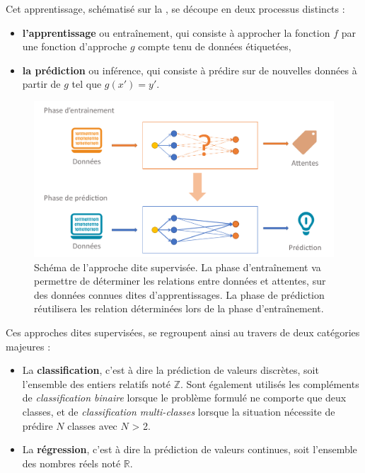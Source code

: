 Cet apprentissage, schématisé sur la , se découpe en deux processus distincts :
\begin{itemize}
    \item \textbf{l’apprentissage} ou entraînement, qui consiste à approcher la fonction $f$ par une fonction d’approche $g$ compte tenu de données étiquetées,
    \item \textbf{la prédiction} ou inférence, qui consiste à prédire sur de nouvelles données à partir de $g$ tel que $g(x') = y'$.
\end{itemize}\par

\begin{figure}[H]
    \centering
    \includegraphics[width=0.8\linewidth]{contents/chapter_3/resources/scheme_supervised_classification.pdf}
    \caption{Schéma de l’approche dite supervisée. La phase d'entraînement va permettre de déterminer les relations entre données et attentes, sur des données connues dites d'apprentissages. La phase de prédiction réutilisera les relation déterminées lors de la phase d'entraînement. }
    \label{fig:scheme_supervised_classification}
\end{figure}

Ces approches dites supervisées, se regroupent ainsi au travers de deux catégories majeures :
\begin{itemize}
    \item La \textbf{classification}, c'est à dire la prédiction de valeurs discrètes, soit l’ensemble des entiers relatifs noté $\pmb{\mathbb{Z}}$. Sont également utilisés les compléments de \textit{classification binaire} lorsque le problème formulé ne comporte que deux classes, et de \textit{classification multi-classes} lorsque la situation nécessite de prédire $N$ classes avec $N$ > 2.
    \item La \textbf{régression}, c'est à dire la prédiction de valeurs continues, soit l’ensemble des nombres réels noté $\pmb{\mathbb{R}}$.
\end{itemize}\par

